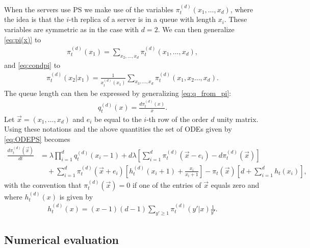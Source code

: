 \documentclass[acmsmall,nonacm]{acmart}
\begin{document}
When the servers use PS we make use of the variables $\pi_t^{(d)}(x_1,\ldots,x_d)$,
where the idea is that the $i$-th replica of a server is in a queue with length $x_i$.
These variables are symmetric as in the case with $d=2$.
We can then generalize \eqref{eq:pi(x)} to
\begin{align*}
    \pi_t^{(d)}(x_1)=\sum_{x_2,\ldots,x_d}\pi_t^{(d)}(x_1,\ldots,x_d),
\end{align*}
and \eqref{eq:condpi} to
\begin{align*}
    \pi_t^{(d)}(x_2|x_1)=\frac{1}{x_t^{(d)}(x_1)} \sum_{x_3,\ldots,x_d}\pi_t^{(d)}(x_1,x_2\ldots,x_d).
\end{align*}
The queue length can then be expressed by generalizing \eqref{eq:q_from_pi}:
\begin{align*}
    q_t^{(d)}(x)=\frac{d\pi_t^{(d)}(x)}{x}.
\end{align*}
Let $\vec x=(x_1,\ldots,x_d)$ and $e_i$ be equal to the $i$-th row of the order $d$ unity
matrix. Using these notations and the above quantities the set of ODEs given by \eqref{eq:ODEPS} becomes
\begin{align*}
      \frac{d \pi_t^{(d)}(\vec x)}{dt} &= \lambda \prod_{i=1}^d q_t^{(d)}(x_i-1) 
    +d\lambda \left[\sum_{i=1}^d \pi_t^{(d)}(\vec x - e_i)-d\pi_t^{(d)}(\vec x)\right] 
    \nonumber \\ 
    &\quad+ \sum_{i=1}^d \pi_t^{(d)}(\vec x + e_i)
    \left[ h_t^{(d)}(x_i+1)+ \frac{x_i}{x_i+1}\right]  
    - \pi_t(\vec x)\left[d+\sum_{i=1}^d  h_t(x_i)\right],
\end{align*}
with the convention that $\pi_t^{(d)}(\vec x)=0$ if one of the entries of 
$\vec x$ equals zero and where $h_t^{(d)}(x)$ is given by
\begin{align*}
     h_t^{(d)}(x) = (x-1)(d-1)\sum_{y'\geq 1} \pi_t^{(d)}(y'|x) \frac{1}{y'}.
\end{align*}

\subsection{Numerical evaluation}
\end{document}
